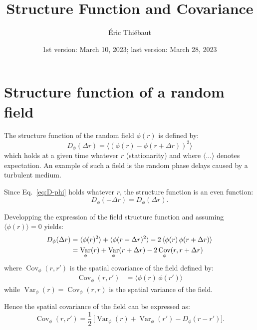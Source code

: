\documentclass{article}
\DeclareMathOperator{\Var}{Var}
\DeclareMathOperator{\Cov}{Cov}
\begin{document}
\title{Structure Function and Covariance}
\author {Éric Thiébaut}
\date{1st version: March 10, 2023; last version: March 28, 2023}
\maketitle

\section{Structure function of a random field}

The structure function of the random field $\phi(r)$ is defined by:
\begin{equation}
  \label{eq:D-phi}
  D_{\phi}(\Delta r) = \langle(\phi(r) - \phi(r+\Delta r))^{2}\rangle
\end{equation}
which holds at a given time whatever $r$ (stationarity) and where
$\langle\ldots\rangle$ denotes expectation. An example of such a field is the
random phase delays caused by a turbulent medium.

Since Eq.~\eqref{eq:D-phi} holds whatever $r$, the structure function is an
even function:
\begin{equation}
  \label{eq:D-phi-even}
  D_{\phi}(-\Delta r) =  D_{\phi}(\Delta r).
\end{equation}

Developping the expression of the field structure function and assuming
$\langle\phi(r)\rangle = 0$ yields:
\begin{align}
  D_{\phi}(\Delta r)
  &= \langle\phi(r)^{2}\rangle + \langle\phi(r+\Delta r)^{2}\rangle
    - 2\,\langle\phi(r)\,\phi(r+\Delta r)\rangle\notag \\
  &= \Var_{\phi}(r) + \Var_{\phi}(r + \Delta r) - 2 \Cov_{\phi}(r, r + \Delta r)
\end{align}
where $\Cov_{\phi}(r,r')$ is the spatial covariance of the field defined by:
\begin{align}
  \Cov_{\phi}(r,r')
  &= \langle\phi(r)\,\phi(r')\rangle
\end{align}
while $\Var_{\phi}(r) = \Cov_{\phi}(r,r)$ is the spatial variance of the field.

Hence the spatial covariance of the field can be expressed as:
\begin{equation}
  \label{eq:Cov-phi}
  \Cov_{\phi}(r,r') = \frac12\,\bigl[
    \Var_{\phi}(r) + \Var_{\phi}(r') - D_{\phi}(r - r')
  \bigr].
\end{equation}
\end{document}

